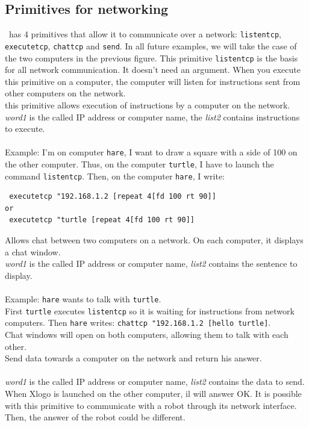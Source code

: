 \subsection{Primitives for networking} 
\xlogo\ has 4 primitives that allow it to communicate over a network: \texttt{listentcp}, \texttt{executetcp}, \texttt{chattcp} and \texttt{send}. In all future examples, we will take the case of the two computers in the previous figure.
This primitive \texttt{listentcp} is the basis for all network communication. It doesn't need an argument. When you execute this primitive on a computer, the computer will listen for instructions sent from other computers on the network. \\
 this primitive allows execution of instructions by a computer on the network.\\
\textit{word1} is the called IP address or computer name, the \textit{list2} contains instructions to execute.\\ \\
Example: I'm on computer \texttt{hare}, I want to draw a square with a side of 100 on the other computer.  Thus, on the computer  \texttt{turtle}, I have to launch the command \texttt{listentcp}. Then, on the computer \texttt{hare}, I write:\\
\begin{verbatim}
 executetcp "192.168.1.2 [repeat 4[fd 100 rt 90]]
or 
 executetcp "turtle [repeat 4[fd 100 rt 90]]
\end{verbatim}
\noindent {}
Allows chat between two computers on a network. On each computer, it displays a chat window.\\
\textit{word1} is the called IP address or computer name, \textit{list2} contains the sentence to display.\\ \\
Example: \texttt{hare} wants to talk with \texttt{turtle}.\\
First \texttt{turtle} executes \texttt{listentcp} so it is waiting for instructions from network computers. Then \texttt{hare} writes: \texttt{chattcp~"192.168.1.2~[hello turtle]}.\\
Chat windows will open on both computers, allowing them to talk with each other.\\ 
Send data towards a computer on the network and return his answer.\\ \\
\textit{word1} is the called IP address or computer name, \textit{list2} contains the data to send. When Xlogo is launched on the other computer, il will answer OK. It is possible with this primitive to communicate with a robot through its network interface. Then, the answer of the robot could be different.\\ \\
